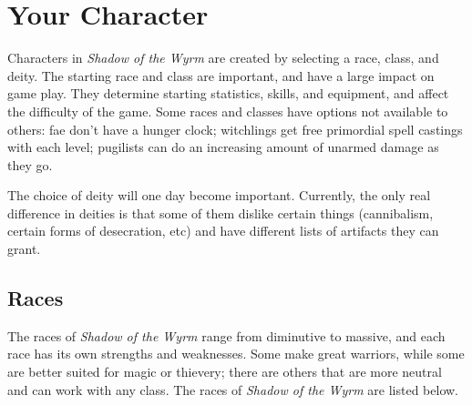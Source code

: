 \section{Your Character}

Characters in {\it Shadow of the Wyrm} are created by selecting a race,
class, and deity.  The starting race and class are important, and have a
large impact on game play. They determine starting statistics, skills, and 
equipment, and affect the difficulty of the game.  Some races and classes
have options not available to others: fae don't have a hunger clock;
witchlings get free primordial spell castings with each level; pugilists
can do an increasing amount of unarmed damage as they go.  

The choice of deity will one day become important.  Currently, the only
real difference in deities is that some of them dislike certain things
(cannibalism, certain forms of desecration, etc) and have different lists
of artifacts they can grant.  

\subsection{Races}

The races of {\it Shadow of the Wyrm} range from diminutive to massive, and
each race has its own strengths and weaknesses.  Some make great warriors, 
while some are better suited for magic or thievery; there are others that
are more neutral and can work with any class.  The races of {\it Shadow
of the Wyrm} are listed below.

